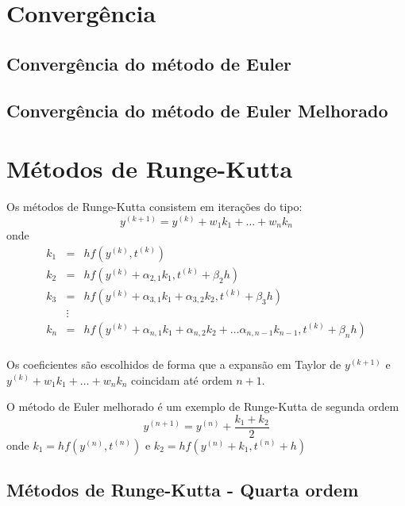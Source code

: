 \section{Convergência}

\emconstrucao

\subsection{Convergência do método de Euler}\label{sec_conv_Euler}

\emconstrucao

\subsection{Convergência do método de Euler Melhorado}

\emconstrucao

\section{Métodos de Runge-Kutta}\label{sec_RK}

Os métodos de Runge-Kutta consistem em iterações do tipo:
$$y^{(k+1)}=y^{(k)}+w_1 k_1 + \ldots + w_n k_n$$
onde
\begin{eqnarray*}
k_1&=&hf(y^{(k)},t^{(k)})\\
k_2&=&hf(y^{(k)}+\alpha_{2,1}k_1,t^{(k)}+\beta_{2}h)\\
k_3&=&hf(y^{(k)}+\alpha_{3,1}k_1+\alpha_{3,2}k_2,t^{(k)}+\beta_{3}h)\\
&\vdots&\\
k_n&=&hf(y^{(k)}+\alpha_{n,1}k_1+\alpha_{n,2}k_2+\ldots \alpha_{n,n-1}k_{n-1},t^{(k)}+\beta_{n}h)\\
\end{eqnarray*}

Os coeficientes são escolhidos de forma que a expansão em Taylor de $y^{(k+1)}$ e $y^{(k)}+w_1 k_1 + \ldots + w_n k_n$ coincidam até ordem $n+1$.

\begin{ex} O método de Euler melhorado é um exemplo de Runge-Kutta de segunda ordem
$$y^{(n+1)}=y^{(n)}+\frac{k_1+k_2}{2}$$
onde $k_1=hf(y^{(n)},t^{(n)})$ e $k_2=hf(y^{(n)}+k_1,t^{(n)}+h)$
\end{ex}

\subsection{Métodos de Runge-Kutta - Quarta ordem}

